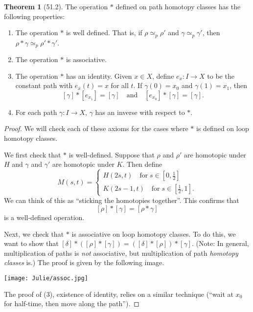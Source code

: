 \documentclass{article}
\newcommand{\nline}{\vspace*{0.5\baselineskip}}
\theoremstyle{definition}
\newtheorem{theorem}{Theorem}[subsection]
\begin{document}
\begin{flushleft}
\begin{theorem}[51.2]
The operation $*$ defined on path homotopy classes has the following properties:
\begin{enumerate}
    \item The operation $*$ is well defined. That is, if $\rho \simeq_p \rho'$ and $\gamma \simeq_p \gamma'$, then $\rho * \gamma \simeq_p \rho' * \gamma'$.
    \item The operation $*$ is associative.
    \item The operation $*$ has an identity. Given $x \in X$, define $e_x : I \to X$ to be the constant path with $e_x(t) = x$ for all $t$. If $\gamma(0) = x_0$ and $\gamma(1) = x_1$, then
    \[
    [\gamma] * [e_{x_1}] = [\gamma] \quad \text{and} \quad [e_{x_0}] * [\gamma] = [\gamma].
    \]
    \item For each path $\gamma : I \to X$, $\gamma$ has an inverse with respect to $*$.
\end{enumerate}
\end{theorem}

\begin{proof}
We will check each of these axioms for the cases where $*$ is defined on loop homotopy classes.

\nline

We first check that $*$ is well-defined. Suppose that $\rho$ and $\rho'$ are homotopic under $H$ and $\gamma$ and $\gamma'$ are homotopic under $K$. Then define
\[
M(s, t) = \begin{cases}
H(2s, t) \quad \text{for} \; s \in [0,\frac{1}{2}] \\
K(2s - 1, t) \quad \text{for} \; s \in [\frac{1}{2}, 1].
\end{cases}
\]
We can think of this as ``sticking the homotopies together''. This confirms that
\[
[\rho] * [\gamma] = [\rho * \gamma]
\]
is a well-defined operation.

\nline

Next, we check that $*$ is associative on loop homotopy classes. To do this, we want to show that $[\delta] * ([\rho] * [\gamma]) = ([\delta] * [\rho]) * [\gamma]$. (Note: In general, multiplication of paths is \textit{not} associative, but multiplication of path \textit{homotopy classes} is.) The proof is given by the following image.

\begin{center}
\texttt{[image: Julie/assoc.jpg]}
\end{center}

The proof of (3), existence of identity, relies on a similar technique (``wait at $x_0$ for half-time, then move along the path'').


\end{proof}
\end{flushleft}
\end{document}
